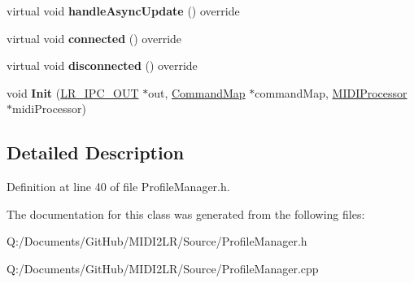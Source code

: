 \begin{DoxyCompactItemize}
\item 
virtual void {\bfseries handle\+Async\+Update} () override\hypertarget{class_profile_manager_a06dda29b41856d4c2e9e85132a79da5a}{}\label{class_profile_manager_a06dda29b41856d4c2e9e85132a79da5a}

\item 
virtual void {\bfseries connected} () override\hypertarget{class_profile_manager_acdf4ad1cdaf3e5f3178cd48604471117}{}\label{class_profile_manager_acdf4ad1cdaf3e5f3178cd48604471117}

\item 
virtual void {\bfseries disconnected} () override\hypertarget{class_profile_manager_a2012de57ea041dcf2680a824bf68a423}{}\label{class_profile_manager_a2012de57ea041dcf2680a824bf68a423}

\item 
void {\bfseries Init} (\hyperlink{class_l_r___i_p_c___o_u_t}{L\+R\+\_\+\+I\+P\+C\+\_\+\+O\+UT} $\ast$out, \hyperlink{class_command_map}{Command\+Map} $\ast$command\+Map, \hyperlink{class_m_i_d_i_processor}{M\+I\+D\+I\+Processor} $\ast$midi\+Processor)\hypertarget{class_profile_manager_a76dc54676ec7097b7bc8adf0bdfed9b4}{}\label{class_profile_manager_a76dc54676ec7097b7bc8adf0bdfed9b4}

\end{DoxyCompactItemize}


\subsection{Detailed Description}


Definition at line 40 of file Profile\+Manager.\+h.



The documentation for this class was generated from the following files\+:\begin{DoxyCompactItemize}
\item 
Q\+:/\+Documents/\+Git\+Hub/\+M\+I\+D\+I2\+L\+R/\+Source/Profile\+Manager.\+h\item 
Q\+:/\+Documents/\+Git\+Hub/\+M\+I\+D\+I2\+L\+R/\+Source/Profile\+Manager.\+cpp\end{DoxyCompactItemize}
